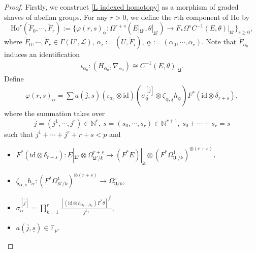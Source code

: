 \documentclass[12pt, a4paper]{article}
\begin{document}
\begin{proof}
Firstly, we construct \eqref{L indexed homotopy} as a morphism of graded shaves of abelian groups. For any $r>0$, we define the $r$th component of $\mathrm{Ho}$ by
$$
\mathrm{Ho}^r(\tilde F_0,\cdots,\tilde F_r):=\{\varphi(r,s)_{\underline\alpha}:\Omega^{r+s}(E|_{\mathfrak U'},\theta|_{\mathfrak U'})\to F_*\Omega^sC^{-1}(E,\theta)|_{\mathfrak U'}\}_{s\geq0},
$$
where $\tilde F_0,\cdots,\tilde F_r\in\Gamma(U',\mathcal L)$, $\alpha_i:=(U,\tilde F_i),~\underline\alpha:=(\alpha_0,\cdots,\alpha_r)$. Note that $\tilde F_{\alpha_0}$ induces an identification 
\begin{eqnarray}\label{iota}
\iota_{\alpha_0}:(H_{\alpha_0},\nabla_{\alpha_0})\cong C^{-1}(E,\theta)|_{\mathfrak U}.
\end{eqnarray}
Define
\begin{eqnarray}\label{construction varphi}
\varphi(r,s)_{\underline\alpha}=\sum a(\overline j,\underline s)(\iota_{\alpha_0}\otimes\mathrm{id})(\sigma_{\underline\alpha}^{[\overline j]}\otimes\zeta_{\underline\alpha,\underline s}h_{\underline\alpha})F^*(\mathrm{id}\otimes\delta_{r+s}),
\end{eqnarray}
where the summation takes over 
$$\overline j=(j^1,\cdots,j^r)\in\mathbb N^r,~\underline s=(s_0,\cdots,s_r)\in\mathbb N^{r+1},~s_0+\cdots+s_r=s$$
 such that $j^1+\cdots+j^r+r+s<p$ and
\begin{itemize}
\item $F^*(\mathrm{id}\otimes\delta_{r+s}):E|_{\mathfrak U'}\otimes\Omega^{r+s}_{\mathfrak U'/k}\to (F^*E)|_{\mathfrak U}\otimes(F^*\Omega^1_{\mathfrak U'/k})^{\otimes(r+s)}$,
\item $\zeta_{\underline\alpha,\underline s}h_{\underline\alpha}:(F^*\Omega^1_{\mathfrak U'/k})^{\otimes(r+s)}\to\Omega^s_{\mathfrak U/k}$,
\item $\sigma^{[\overline j]}_{\underline\alpha}=\prod_{k=1}^r\frac{[(\mathrm{id}\otimes h_{\alpha_{k-1}\alpha_k})F^*\theta]^{j^k}}{j^k!}$,
\item $a(\overline j,\underline s)\in\mathbb F_p$.
\end{itemize}


\end{proof}
\end{document}
